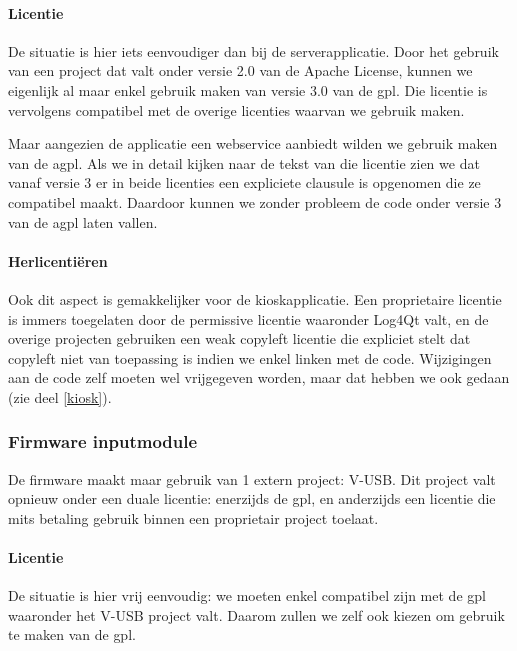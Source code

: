 \paragraph{Licentie} De situatie is hier iets eenvoudiger dan bij de serverapplicatie. Door het gebruik van een project dat valt onder versie 2.0 van de Apache License, kunnen we eigenlijk al maar enkel gebruik maken van versie 3.0 van de \ac{gpl}. Die licentie is vervolgens compatibel met de overige licenties waarvan we gebruik maken.

Maar aangezien de applicatie een webservice aanbiedt wilden we gebruik maken van de \ac{agpl}. Als we in detail kijken naar de tekst van die licentie zien we dat vanaf versie 3 er in beide licenties een expliciete clausule \citetext{\citealp[sectie 13]{fsf:gpl}; \citealp[sectie 13]{fsf:agpl}} is opgenomen die ze compatibel maakt. Daardoor kunnen we zonder probleem de code onder versie 3 van de \ac{agpl} laten vallen.

\paragraph{Herlicentiëren} Ook dit aspect is gemakkelijker voor de kioskapplicatie. Een proprietaire licentie is immers toegelaten door de permissive licentie waaronder Log4Qt valt, en de overige projecten gebruiken een weak copyleft licentie die expliciet stelt dat copyleft niet van toepassing is indien we enkel linken met de code. Wijzigingen aan de code zelf moeten wel vrijgegeven worden, maar dat hebben we ook gedaan (zie deel \ref{kiosk}).

\subsubsection{Firmware inputmodule}
\label{ontwerp:licenties:keuze:software:inputmodule}

De firmware maakt maar gebruik van 1 extern project: V-USB. Dit project valt opnieuw onder een duale licentie: enerzijds de \ac{gpl}, en anderzijds een licentie die mits betaling gebruik binnen een proprietair project toelaat.

\paragraph{Licentie} De situatie is hier vrij eenvoudig: we moeten enkel compatibel zijn met de \ac{gpl} waaronder het V-USB project valt. Daarom zullen we zelf ook kiezen om gebruik te maken van de \ac{gpl}.

